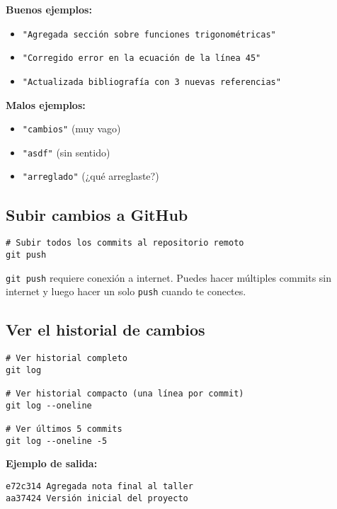\documentclass[11pt,a4paper]{article}
\begin{document}
\begin{warningbox}
\textbf{Buenos ejemplos:}
\begin{itemize}
  \item \texttt{"Agregada sección sobre funciones trigonométricas"}
  \item \texttt{"Corregido error en la ecuación de la línea 45"}
  \item \texttt{"Actualizada bibliografía con 3 nuevas referencias"}
\end{itemize}

\textbf{Malos ejemplos:}
\begin{itemize}
  \item \texttt{"cambios"} (muy vago)
  \item \texttt{"asdf"} (sin sentido)
  \item \texttt{"arreglado"} (¿qué arreglaste?)
\end{itemize}
\end{warningbox}

\subsection{Subir cambios a GitHub}

\begin{lstlisting}[style=bashstyle]
# Subir todos los commits al repositorio remoto
git push
\end{lstlisting}

\begin{infobox}
\texttt{git push} requiere conexión a internet. Puedes hacer múltiples commits sin internet y luego hacer un solo \texttt{push} cuando te conectes.
\end{infobox}

\subsection{Ver el historial de cambios}

\begin{lstlisting}[style=bashstyle]
# Ver historial completo
git log

# Ver historial compacto (una línea por commit)
git log --oneline

# Ver últimos 5 commits
git log --oneline -5
\end{lstlisting}

\textbf{Ejemplo de salida:}
\begin{lstlisting}[style=bashstyle]
e72c314 Agregada nota final al taller
aa37424 Versión inicial del proyecto
\end{lstlisting}
\end{document}
